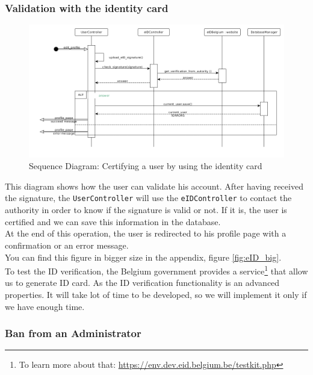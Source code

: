 \subsubsection{Validation with the identity card}
\label{SEC:valid_ID}
\begin{figure}[H]
	\begin{center}
		\includegraphics[width=1\textwidth]{check_ID.png}
		\caption{Sequence Diagram: Certifying a user by using the identity card}
		\label{fig:eID}
	\end{center}
\end{figure}

This diagram shows how the user can validate his account. After having received the signature, the \texttt{UserController} will use the \texttt{eIDController} to contact the authority in order to know if the signature is valid or not. If it is, the user is certified and we can save this information in the database.\\
At the end of this operation, the user is redirected to his profile page with a confirmation or an error message.\\
You can find this figure in bigger size in the appendix, figure \vref{fig:eID_big}.\\

To test the ID verification, the Belgium government provides a service\footnote{To learn more about that: \url{https://env.dev.eid.belgium.be/testkit.php}} that allow us to generate ID card.
As the ID verification functionality is an advanced properties. It will take lot of time to be developed, so we will implement it only if we have enough time.

\subsubsection{Ban from an Administrator}

